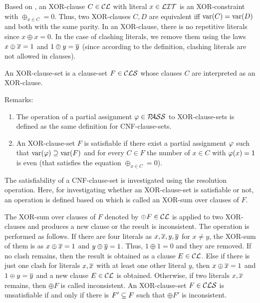 \documentclass{report}
\begin{document}
\begin{defi}\label{def:xor-cls}
Based on \cite{h8}, an XOR-clause $C \in \mathcal{CL}$ with literal $x \in \mathcal{LIT}$ is an XOR-constraint with $\oplus_{x \in C} = 0$. Thus, two XOR-clauses $C, D$ are equivalent iff $\operatorname{var}(C) = \operatorname{var}(D)$ and both with the same parity. In an XOR-clause, there is no repetitive literals since $x \oplus x = 0$. In the case of clashing literals, we remove them using the laws $x \oplus \overline{x} = 1$ and $1 \oplus y = \overline{y}$ (since according to the definition, clashing literals are not allowed in clauses).

An XOR-clause-set is a clause-set $F \in \mathcal{CLS}$ whose clauses $C$ are interpreted as an XOR-clause.  
\end{defi} 

Remarks:
\begin{enumerate}
  \item The operation of a partial assignment $\varphi \in \mathcal{P\hspace{-0.32em}ASS}$ to XOR-clause-sets is defined as the same definition for CNF-clause-sets.
  \item An XOR-clause-set $F$ is satisfiable if there exist a partial assignment $\varphi$ such that $\operatorname{var}(\varphi) \supseteq \operatorname{var}(F)$ and for every $C \in F$ the number of $x \in C$ with $\varphi(x) = 1$ is even (that satisfies the equation  $\oplus_{x \in C} = 0$).
\end{enumerate}

The satisfiability of a CNF-clause-set is investigated using the resolution operation. Here, for investigating whether an XOR-clause-set is satisfiable or not, an operation is defined based on \cite{h8,h23} which is called an XOR-sum over clauses of $F$.

\begin{defi}\label{def:xor-sum}
\cite{h8} The XOR-sum over clauses of $F$ denoted by $\oplus F \in \mathcal{CL}$ is applied to two XOR-clauses and produces a new clause or the result is inconsistent. The operation is performed as follows. If there are four literals as $x,\overline{x},y,\overline{y}$ for $x \ne y$, the XOR-sum of them is as $x \oplus \overline{x} = 1$ and $y \oplus \overline{y} = 1$. Thus, $1 \oplus 1 = 0$ and they are removed. If no clash remains, then the result is obtained as a clause $E \in \mathcal{CL}$. Else if there is just one clash for literals $x, \overline{x}$ with at least one other literal $y$, then $x \oplus \overline{x} = 1$ and $1 \oplus y=\overline{y}$ and a new clause $E \in \mathcal{CL}$ is obtained. Otherwise, if two literals $x, \overline{x}$ remains, then $\oplus F$ is called inconsistent. An XOR-clause-set $F \in \mathcal{CLS}$ is unsatisfiable if and only if there is $F' \subseteq F$ such that $\oplus F'$ is inconsistent.
\end{defi} 
\end{document}
